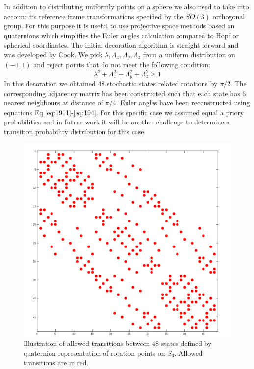 In addition to distributing uniformly points on a sphere we also need to take into account its reference frame transformations specified by the $SO(3)$ orthogonal group. For this purpose it is useful to use projective space methods based on quaternions which simplifies the Euler angles calculation compared to Hopf or spherical coordinates. The initial decoration algorithm is straight forward and was developed by Cook\cite{cook}. We pick $\lambda, \Lambda_x, \Lambda_y,\Lambda_z$ from a uniform distribution on $(-1,1)$ and reject points that do not meet the following condition: 
\begin{equation}\label{eq:cook}
\lambda^2+\Lambda_x^2+\Lambda_y^2+\Lambda_z^2\geq1
\end{equation}
In this decoration we obtained 48 stochastic states related rotations by $\pi/2$. The corresponding adjacency matrix has been constructed such that each state has 6 nearest neighbours at distance of $\pi/4$. Euler angles have been reconstructed using equations Eq.\ref{eq:1911}-\ref{eq:194}. For this specific case we assumed equal a priory probabilities and in future work it will be another challenge to determine a transition probability distribution for this case. 
\begin{figure}[h!]
\begin{center}
\includegraphics[scale=0.5]{figures/chap2/sparce.png}
\caption{Illustration of allowed transitions between 48 states defined by quaternion representation of rotation points on $S_3$. Allowed transitions are in red.}
\label{figure:blumediag}
\end{center}
\end{figure}  
\clearpage

